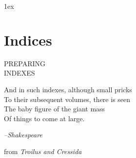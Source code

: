 \parskip1ex 
\newfontfamily{}
\def\deva{{\protect\tibetan\symbol{"0F7C} xx ༃}}

\chapter{Indices}
\pagebreak

\thispagestyle{empty}
    \begin{leftcolumn}
       \begin{center} 
          \huge \noindent PREPARING\\
                   INDEXES
       \end{center}
     
      \medskip

       {\justifying \small\noindent And in such indexes, although small pricks\\
To their subsequent volumes, there is seen\\
The baby figure of the giant mass\\
Of things to come at large. \par
\hfill \textit{--Shakespeare}\par
\hfill\hfill{ \RaggedRight from \textit{Troilus and Cressida}}}
\medskip
       \par
   \end{leftcolumn}
